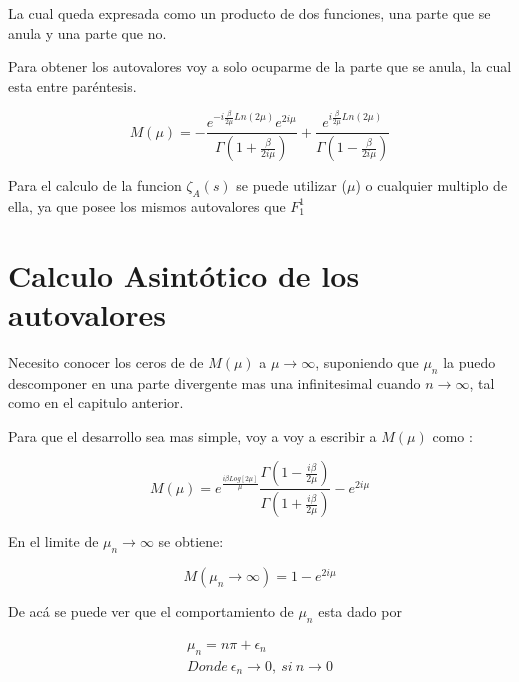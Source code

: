 La cual queda expresada como un producto de dos funciones, una parte que se anula y una parte que no.

Para obtener los autovalores voy a solo ocuparme de la parte que se anula, la cual esta entre paréntesis.

\begin{equation}
    M (\mu) = -
    \frac{e ^{- i \frac{\beta}{2 \mu} Ln(2 \mu) } e ^{2 i \mu} }{\Gamma(1+\frac{ \beta}{2 i \mu})} +
    \frac{e ^{  i \frac{\beta}{2 \mu} Ln(2 \mu) }}               {\Gamma(1-\frac{ \beta}{2 i \mu})}
\label{eq.aproxx}
\end{equation}

Para el calculo de la funcion $\zeta _A (s) $ se puede utilizar ($\mu$) o cualquier multiplo de ella, ya que posee los mismos autovalores que $F_1 ^1 $




\section{Calculo Asintótico de los autovalores}



Necesito conocer los ceros de  de $M(\mu)$ a $\mu \rightarrow{\infty}$, suponiendo que $\mu _n$ la puedo descomponer en una parte divergente mas una infinitesimal cuando $n \rightarrow{\infty}$, tal como en el capitulo anterior.

Para que el desarrollo sea mas simple, voy a voy a escribir a $M (\mu)$ como :

\begin{equation}
M (\mu) = e ^{\frac{i \beta Log[2 \mu]}{\mu}}
\frac{\Gamma (1- \frac{i \beta}{2 \mu})}{\Gamma (1 + \frac{i \beta}{2 \mu})}
- e ^{2 i \mu}
\label{eq.otro.mu}
\end{equation}


En el limite de $\mu _n \rightarrow \infty$ se obtiene:

\begin{equation}
    M(\mu _n \rightarrow \infty) = 
	1 - e ^{2 i \mu}
\end{equation}

De acá se puede ver que el comportamiento de $\mu _n$ esta dado por 


\begin{equation}
\begin{array}{c}
    \mu _n = n \pi + \epsilon _n \\
    Donde \ \epsilon _n \rightarrow{0} ,\ si \ n \rightarrow{0}
\end{array}
\label{eq.mu2}
\end{equation}



